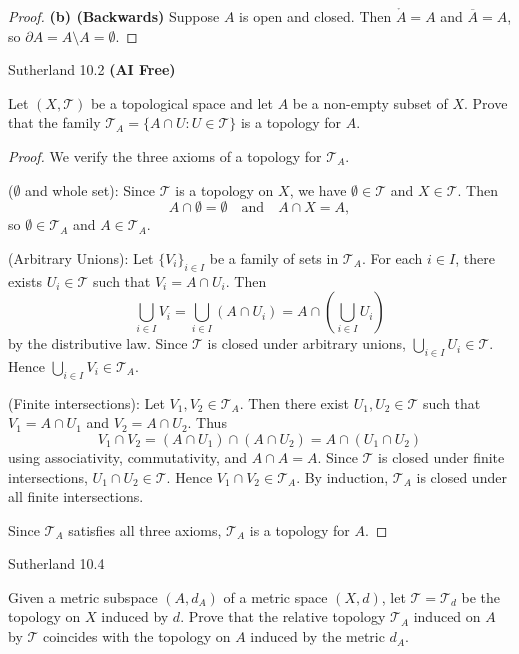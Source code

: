 \documentclass[minion]{homework}
\begin{document}
\begin{problems}
\begin{proof}
\textbf{(b) (Backwards)} Suppose $A$ is open and closed. Then $\mathring{A} = A$ and $\overline{A} = A$, so $\partial A = A \setminus A = \emptyset$.
\end{proof}

\problem Sutherland 10.2 \textbf{(AI Free)}

Let $(X, \mathcal{T})$ be a topological space and let $A$ be a non-empty subset of $X$. Prove that the family $\mathcal{T}_A = \{A \cap U : U \in \mathcal{T}\}$ is a topology for $A$.

\begin{proof}
We verify the three axioms of a topology for $\mathcal{T}_A$.

($\emptyset$ and whole set): Since $\mathcal{T}$ is a topology on $X$, we have $\emptyset \in \mathcal{T}$ and $X \in \mathcal{T}$. Then
$$A \cap \emptyset = \emptyset \quad \text{and} \quad A \cap X = A,$$
so $\emptyset \in \mathcal{T}_A$ and $A \in \mathcal{T}_A$.

(Arbitrary Unions): Let $\{V_i\}_{i \in I}$ be a family of sets in $\mathcal{T}_A$. For each $i \in I$, there exists $U_i \in \mathcal{T}$ such that $V_i = A \cap U_i$. Then
$$\bigcup_{i \in I} V_i = \bigcup_{i \in I} (A \cap U_i) = A \cap \left( \bigcup_{i \in I} U_i \right)$$
by the distributive law. Since $\mathcal{T}$ is closed under arbitrary unions, $\bigcup_{i \in I} U_i \in \mathcal{T}$. Hence $\bigcup_{i \in I} V_i \in \mathcal{T}_A$.

(Finite intersections): Let $V_1, V_2 \in \mathcal{T}_A$. Then there exist $U_1, U_2 \in \mathcal{T}$ such that $V_1 = A \cap U_1$ and $V_2 = A \cap U_2$. Thus
$$V_1 \cap V_2 = (A \cap U_1) \cap (A \cap U_2) = A \cap (U_1 \cap U_2)$$
using associativity, commutativity, and $A \cap A = A$. Since $\mathcal{T}$ is closed under finite intersections, $U_1 \cap U_2 \in \mathcal{T}$. Hence $V_1 \cap V_2 \in \mathcal{T}_A$. By induction, $\mathcal{T}_A$ is closed under all finite intersections.

Since $\mathcal{T}_A$ satisfies all three axioms, $\mathcal{T}_A$ is a topology for $A$.
\end{proof}
\problem Sutherland 10.4

Given a metric subspace $(A, d_A)$ of a metric space $(X, d)$, let $\mathcal{T} = \mathcal{T}_d$ be the topology on $X$ induced by $d$. Prove that the relative topology $\mathcal{T}_A$ induced on $A$ by $\mathcal{T}$ coincides with the topology on $A$ induced by the metric $d_A$.


\end{problems}
\end{document}
